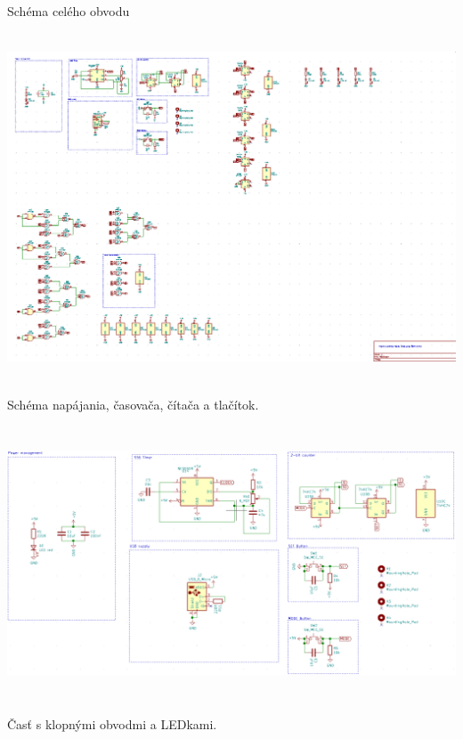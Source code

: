 \newpage
\noindent
Schéma celého obvodu
\begin{center}
    \includegraphics[width=16.2cm, height=10.32cm]{images/kicad.png}
\end{center}
Schéma napájania, časovača, čítača a tlačítok.
\begin{center}
    \includegraphics[width=16.2cm, height=8.1cm]{images/kicad2.png}
\end{center}
\newpage
\noindent
Časť s klopnými obvodmi a LEDkami.
